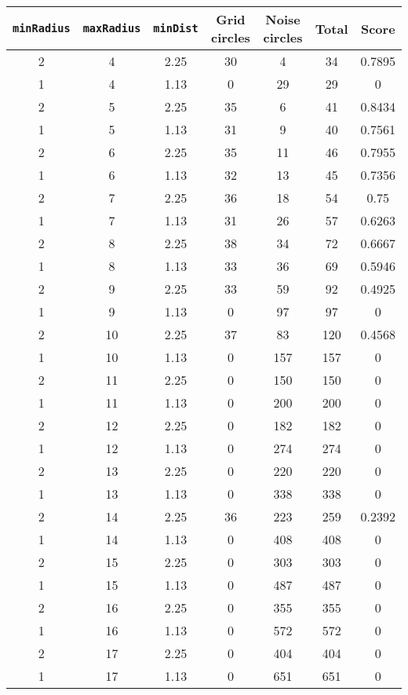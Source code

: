 \documentclass[letterpaper, 12pt]{article}
\begin{document}
\begin{longtable}{|c|c|c|c|c|c|c|}
\hline
\textbf{\texttt{minRadius}} & \textbf{\texttt{maxRadius}} & \textbf{\texttt{minDist}} & \textbf{Grid circles} & \textbf{Noise circles} & \textbf{Total} & \textbf{Score} \\
\hline
2 & 4 & 2.25 & 30 & 4 & 34 & 0.7895 \\
\hline
1 & 4 & 1.13 & 0 & 29 & 29 & 0 \\
\hline
2 & 5 & 2.25 & 35 & 6 & 41 & 0.8434 \\
\hline
1 & 5 & 1.13 & 31 & 9 & 40 & 0.7561 \\
\hline
2 & 6 & 2.25 & 35 & 11 & 46 & 0.7955 \\
\hline
1 & 6 & 1.13 & 32 & 13 & 45 & 0.7356 \\
\hline
2 & 7 & 2.25 & 36 & 18 & 54 & 0.75 \\
\hline
1 & 7 & 1.13 & 31 & 26 & 57 & 0.6263 \\
\hline
2 & 8 & 2.25 & 38 & 34 & 72 & 0.6667 \\
\hline
1 & 8 & 1.13 & 33 & 36 & 69 & 0.5946 \\
\hline
2 & 9 & 2.25 & 33 & 59 & 92 & 0.4925 \\
\hline
1 & 9 & 1.13 & 0 & 97 & 97 & 0 \\
\hline
2 & 10 & 2.25 & 37 & 83 & 120 & 0.4568 \\
\hline
1 & 10 & 1.13 & 0 & 157 & 157 & 0 \\
\hline
2 & 11 & 2.25 & 0 & 150 & 150 & 0 \\
\hline
1 & 11 & 1.13 & 0 & 200 & 200 & 0 \\
\hline
2 & 12 & 2.25 & 0 & 182 & 182 & 0 \\
\hline
1 & 12 & 1.13 & 0 & 274 & 274 & 0 \\
\hline
2 & 13 & 2.25 & 0 & 220 & 220 & 0 \\
\hline
1 & 13 & 1.13 & 0 & 338 & 338 & 0 \\
\hline
2 & 14 & 2.25 & 36 & 223 & 259 & 0.2392 \\
\hline
1 & 14 & 1.13 & 0 & 408 & 408 & 0 \\
\hline
2 & 15 & 2.25 & 0 & 303 & 303 & 0 \\
\hline
1 & 15 & 1.13 & 0 & 487 & 487 & 0 \\
\hline
2 & 16 & 2.25 & 0 & 355 & 355 & 0 \\
\hline
1 & 16 & 1.13 & 0 & 572 & 572 & 0 \\
\hline
2 & 17 & 2.25 & 0 & 404 & 404 & 0 \\
\hline
1 & 17 & 1.13 & 0 & 651 & 651 & 0 \\

\end{longtable}
\end{document}
